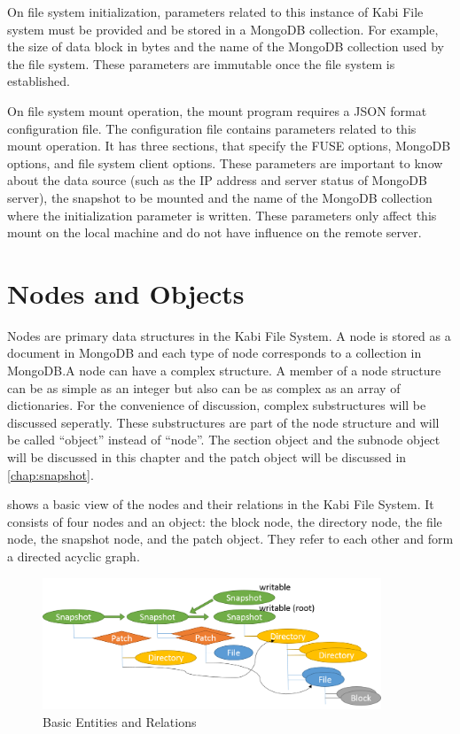     On file system initialization, parameters related to this instance of Kabi File system must be provided and be stored in a MongoDB collection. For example, the size of data block in bytes and the name of the MongoDB collection used by the file system. These parameters are immutable once the file system is established.

    On file system mount operation, the mount program requires a JSON format configuration file. The configuration file contains parameters related to this mount operation. It has three sections, that specify the FUSE options, MongoDB options, and file system client options. These parameters are important to know about the data source (such as the IP address and server status of MongoDB server), the snapshot to be mounted and the name of the MongoDB collection where the initialization parameter is written. These parameters only affect this mount on the local machine and do not have influence on the remote server.

\section{Nodes and Objects}

    Nodes are primary data structures in the Kabi File System. A node is stored as a document in MongoDB and each type of node corresponds to a collection in MongoDB.A node can have a complex structure. A member of a node structure can be as simple as an integer but also can be as complex as an array of dictionaries. For the convenience of discussion, complex substructures will be discussed seperatly. These substructures are part of the node structure and will be called ``object'' instead of ``node''. The section object and the subnode object will be discussed in this chapter and the patch object will be discussed in \cref{chap:snapshot}.

     shows a basic view of the nodes and their relations in the Kabi File System. It consists of four nodes and an object: the block node, the directory node, the file node, the snapshot node, and the patch object. They refer to each other and form a directed acyclic graph. 

\begin{figure}[hbtp]
\centering
\includegraphics[width=0.9\textwidth]{Chapter-3/figs/fig2.png}
\caption{Basic Entities and Relations}
\label{fig:basic_entities}
\end{figure}

